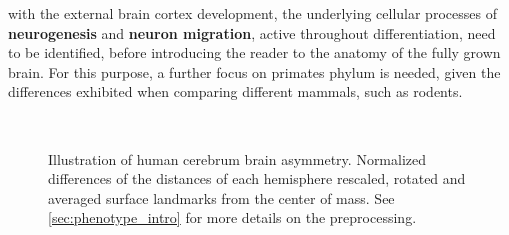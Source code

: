 with the external brain cortex development, the underlying cellular processes of \textbf{neurogenesis} and  \textbf{neuron migration}, active throughout differentiation, need to be identified, before introducing the reader to the anatomy of the fully grown brain. For this purpose, a further focus on primates phylum is needed, given the differences exhibited when comparing different mammals, such as rodents\cite{Molnar2019}.


\begin{figure}[H]
	\centering
	\\
	\caption[Human cerebrum brain asymmetry]{Illustration of human cerebrum brain asymmetry. Normalized differences of the distances of each hemisphere rescaled, rotated and averaged surface landmarks from the center of mass. See \autoref{sec:phenotype_intro} for more details on the preprocessing.}
	\label{fig:brainlat}
\end{figure}

